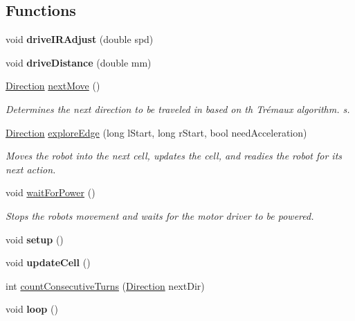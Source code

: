 \subsection*{Functions}
\begin{DoxyCompactItemize}
\item 
\mbox{\label{PCB__test_8ino_ab7aece27431c153f5407864297b7c32b}} 
void {\bfseries drive\+I\+R\+Adjust} (double spd)
\item 
\mbox{\label{PCB__test_8ino_a56dfd95fece10fad4869ceb37cfe035d}} 
void {\bfseries drive\+Distance} (double mm)
\item 
\mbox{\label{PCB__test_8ino_abe60ad2fecd7fb38997addbd92d88c68}} 
\hyperlink{util_8h_a92e22a126ad6bf9d255b517e70d083f6}{Direction} \hyperlink{PCB__test_8ino_abe60ad2fecd7fb38997addbd92d88c68}{next\+Move} ()
\begin{DoxyCompactList}\small\item\em Determines the next direction to be traveled in based on th Trémaux algorithm. s. \end{DoxyCompactList}\item 
\hyperlink{util_8h_a92e22a126ad6bf9d255b517e70d083f6}{Direction} \hyperlink{PCB__test_8ino_abc9fd4d649a1719e3e8f25cf3fd22857}{explore\+Edge} (long l\+Start, long r\+Start, bool need\+Acceleration)
\begin{DoxyCompactList}\small\item\em Moves the robot into the next cell, updates the cell, and readies the robot for its next action. \end{DoxyCompactList}\item 
\mbox{\label{PCB__test_8ino_ad9d79fb25b7ad31450ea631b61f1883e}} 
void \hyperlink{PCB__test_8ino_ad9d79fb25b7ad31450ea631b61f1883e}{wait\+For\+Power} ()
\begin{DoxyCompactList}\small\item\em Stops the robot\textquotesingle{}s movement and waits for the motor driver to be powered. \end{DoxyCompactList}\item 
\mbox{\label{PCB__test_8ino_a4fc01d736fe50cf5b977f755b675f11d}} 
void {\bfseries setup} ()
\item 
\mbox{\label{PCB__test_8ino_a25f18de883c5d893238db0b25fb9f471}} 
void {\bfseries update\+Cell} ()
\item 
int \hyperlink{PCB__test_8ino_a1f32d7057151c1c7f0f16a945a27af1e}{count\+Consecutive\+Turns} (\hyperlink{util_8h_a92e22a126ad6bf9d255b517e70d083f6}{Direction} next\+Dir)
\item 
\mbox{\label{PCB__test_8ino_afe461d27b9c48d5921c00d521181f12f}} 
void {\bfseries loop} ()
\end{DoxyCompactItemize}
